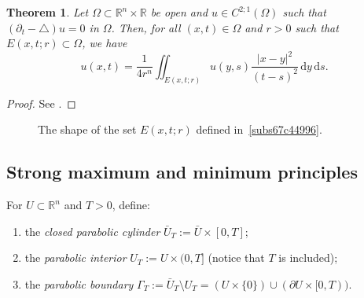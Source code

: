 \documentclass[a4paper,9pt]{amsart}
\newcommand{\R}{\mathbb{R}}	%
\newcommand{\did}{\,\mathrm{d}}	%
\newcommand{\de}{\partial}		%
\newcommand{\laplacian}{\triangle}
\theoremstyle{plain}
\newtheorem{theorem}[proposition]{Theorem}
\theoremstyle{definition}
\theoremstyle{remark}
\begin{document}
\begin{theorem}\label{thm67cf158e}
	Let $\Omega\subset\R^n\times\R$ be open and $u\in C^{2;1}(\Omega)$ such that $(\de_t-\laplacian)u=0$ in $\Omega$.
	Then, for all $(x,t)\in\Omega$ and $r>0$ such that $E(x,t;r)\subset \Omega$, we have
	\begin{equation}
		u(x,t) = \frac{1}{4r^n} \iint_{E(x,t;r)} u(y,s) \frac{|x-y|^2}{(t-s)^2} \did y \did s .
	\end{equation}
\end{theorem}
\begin{proof}
	See \cite[pag.53]{MR2597943}.
\end{proof}

\begin{figure}\label{fig67cf14e8}
\caption{The shape of the set $E(x,t;r)$ defined in~\ref{subs67c44996}.}
\end{figure}

\subsection{Strong maximum and minimum principles}\label{subs67c44a2b}

For $U\subset\R^n$ and $T>0$, define:
\begin{enumerate}
\item
the \emph{closed parabolic cylinder} $\bar U_T := \bar U\times[0,T]$;
\item
the \emph{parabolic interior} $U_T := U\times(0,T]$ (notice that $T$ is included);
\item
the \emph{parabolic boundary} $\Gamma_T := \bar U_T \setminus U_T = (U\times\{0\}) \cup (\de U\times [0,T) )$.
\end{enumerate}
\end{document}
